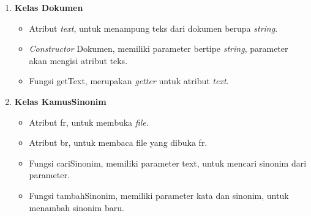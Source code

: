 \begin{enumerate}
	\item \textbf{Kelas Dokumen}
	\begin{itemize}
		\item Atribut \textit{text}, untuk menampung teks dari dokumen berupa \textit{string}.
		\item \textit{Constructor} Dokumen, memiliki parameter bertipe \textit{string}, parameter akan mengisi atribut teks.
		\item Fungsi getText, merupakan \textit{getter} untuk atribut \textit{text}.
	\end{itemize}
	
	\item \textbf{Kelas KamusSinonim}
	\begin{itemize}
		\item Atribut fr, untuk membuka \textit{file}.
		\item Atribut br, untuk membaca file yang dibuka fr.
		\item Fungsi cariSinonim, memiliki parameter text, untuk mencari sinonim dari parameter.
		\item Fungsi tambahSinonim, memiliki parameter kata dan sinonim, untuk menambah sinonim baru.
	\end{itemize}
	
\end{enumerate}